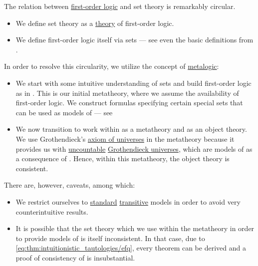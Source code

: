 \begin{remark}\label{rem:set_definition_recursion}
  The relation between \hyperref[sec:first_order_logic]{first-order logic} and set theory is remarkably circular.

  \begin{itemize}
    \item We define set theory as a \hyperref[def:first_order_theory]{theory} of first-order logic.

    \item We define first-order logic itself via sets --- see even the basic definitions from .
  \end{itemize}

  In order to resolve this circularity, we utilize the concept of \hyperref[con:metalogic]{metalogic}:
  \begin{itemize}
    \item We start with some intuitive understanding of sets and build first-order logic as in . This is our initial metatheory, where we assume the availability of first-order logic. We construct formulas specifying certain special sets that can be used as models of  --- see 

    \item We now transition to work within  as a metatheory and  as an object theory. We use Grothendieck's \hyperref[def:axiom_of_universes]{axiom of universes} in the metatheory because it provides us with \hyperref[def:set_countability/uncountable]{uncountable} \hyperref[def:grothendieck_universe]{Grothendieck universes}, which are models of  as a consequence of . Hence, within this metatheory, the object theory  is consistent.
  \end{itemize}

  There are, however, caveats, among which:
  \begin{itemize}
    \item We restrict ourselves to \hyperref[rem:standard_model_of_set_theory]{standard} \hyperref[rem:transitive_model_of_set_theory]{transitive} models in order to avoid very counterintuitive results.

    \item It is possible that the set theory which we use within the metatheory in order to provide models of  is itself inconsistent. In that case, due to \eqref{eq:thm:intuitionistic_tautologies/efq}, every theorem can be derived and a proof of consistency of  is insubstantial.
  \end{itemize}
\end{remark}

